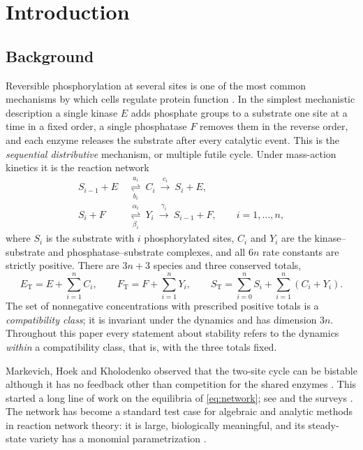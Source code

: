 \documentclass[11pt]{article}
\theoremstyle{plain}
\theoremstyle{definition}
\theoremstyle{remark}
\numberwithin{equation}{section}
\newcommand{\ET}{E_{\mathrm T}}
\newcommand{\FT}{F_{\mathrm T}}
\newcommand{\ST}{S_{\mathrm T}}
\begin{document}
\section{Introduction}

\subsection{Background}
Reversible phosphorylation at several sites is one of the most common mechanisms by which cells
regulate protein function \cite{Cohen2000,SalazarHofer2009}. In the simplest mechanistic
description a single kinase \(E\) adds phosphate groups to a substrate one site at a time in a
fixed order, a single phosphatase \(F\) removes them in the reverse order, and each enzyme
releases the substrate after every catalytic event. This is the \emph{sequential distributive}
mechanism, or multiple futile cycle. Under mass-action kinetics it is the reaction network
\begin{equation}\label{eq:network}
\begin{aligned}
 S_{i-1}+E &\ \underset{b_i}{\overset{a_i}{\rightleftharpoons}}\ C_i
       \ \xrightarrow{\ c_i\ }\ S_i+E,\\[3pt]
 S_i+F &\ \underset{\beta_i}{\overset{\alpha_i}{\rightleftharpoons}}\ Y_i
       \ \xrightarrow{\ \gamma_i\ }\ S_{i-1}+F,
       \qquad i=1,\dots,n,
\end{aligned}
\end{equation}
where \(S_i\) is the substrate with \(i\) phosphorylated sites, \(C_i\) and \(Y_i\) are the
kinase--substrate and phosphatase--substrate complexes, and all \(6n\) rate constants are
strictly positive. There are \(3n+3\) species and three conserved totals,
\begin{equation}\label{eq:totals}
 \ET=E+\sum_{i=1}^n C_i,\qquad
 \FT=F+\sum_{i=1}^n Y_i,\qquad
 \ST=\sum_{i=0}^n S_i+\sum_{i=1}^n(C_i+Y_i).
\end{equation}
The set of nonnegative concentrations with prescribed positive totals is a
\emph{compatibility class}; it is invariant under the dynamics and has dimension \(3n\).
Throughout this paper every statement about stability refers to the dynamics \emph{within} a
compatibility class, that is, with the three totals fixed.

Markevich, Hoek and Kholodenko observed that the two-site cycle can be bistable although it has
no feedback other than competition for the shared enzymes \cite{Markevich2004}. This started a
long line of work on the equilibria of \eqref{eq:network}; see
\cite{Gunawardena2005,ConradiFlockerziRaisch2008,ThomsonGunawardena2009,FeliuWiuf2012,
HolsteinFlockerziConradi2013,ConradiMincheva2014,HellRendall2015,CFMW2017,
BihanDickensteinGiaroli2020,FKdWY2022,TorresFeliu2021} and the surveys
\cite{ConradiShiu2018,Dickenstein2016,Dickenstein2020}. The network has become a standard test
case for algebraic and analytic methods in reaction network theory: it is large, biologically
meaningful, and its steady-state variety has a monomial parametrization \cite{PDSC2012}.
\end{document}
